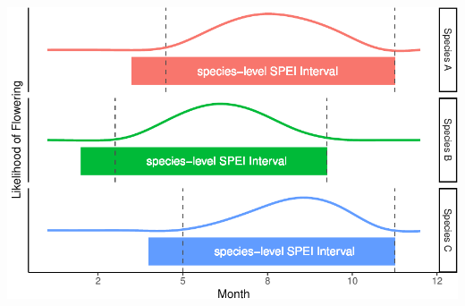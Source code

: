 \documentclass[
]{article}
\begin{document}
\includegraphics{figures/uniqueSPEIfig-1.pdf}
\end{document}
